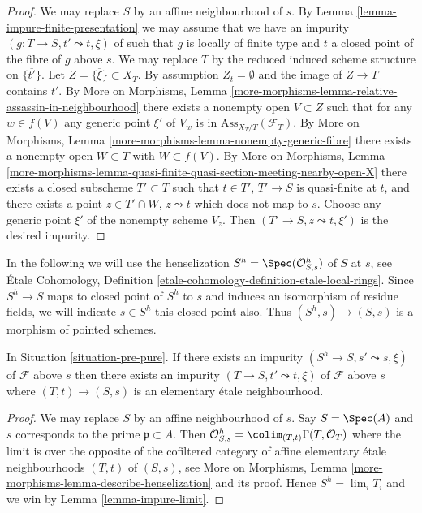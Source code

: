 \begin{proof}
We may replace $S$ by an affine neighbourhood of $s$. By
Lemma \ref{lemma-impure-finite-presentation}
we may assume that we have an impurity $(g : T \to S, t' \leadsto t, \xi)$
of such that $g$ is locally of finite type and $t$ a closed point of the
fibre of $g$ above $s$. We may replace $T$ by the reduced induced
scheme structure on $\overline{\{t'\}}$. Let
$Z = \overline{\{\xi\}} \subset X_T$. By assumption $Z_t = \emptyset$
and the image of $Z \to T$ contains $t'$. By
More on Morphisms,
Lemma \ref{more-morphisms-lemma-relative-assassin-in-neighbourhood}
there exists a nonempty open $V \subset Z$ such that for any
$w \in f(V)$ any generic point $\xi'$ of $V_w$ is in
$\text{Ass}_{X_T/T}(\mathcal{F}_T)$. By
More on Morphisms, Lemma \ref{more-morphisms-lemma-nonempty-generic-fibre}
there exists a nonempty open $W \subset T$ with $W \subset f(V)$. By
More on Morphisms, Lemma
\ref{more-morphisms-lemma-quasi-finite-quasi-section-meeting-nearby-open-X}
there exists a closed subscheme $T' \subset T$ such that
$t \in T'$, $T' \to S$ is quasi-finite at $t$, and there exists a point
$z \in T' \cap W$, $z \leadsto t$ which does not map to $s$.
Choose any generic point $\xi'$ of the nonempty scheme $V_z$.
Then $(T' \to S, z \leadsto t, \xi')$ is the desired impurity.
\end{proof}

\noindent
In the following we will use the henselization
$S^h = \Spec(\mathcal{O}_{S, s}^h)$
of $S$ at $s$, see
\'Etale Cohomology,
Definition \ref{etale-cohomology-definition-etale-local-rings}.
Since $S^h \to S$ maps to closed point of $S^h$ to $s$ and
induces an isomorphism of residue fields, we will indicate
$s \in S^h$ this closed point also. Thus $(S^h, s) \to (S, s)$ is
a morphism of pointed schemes.

\begin{lemma}
\label{lemma-impurity-on-henselization}
In Situation \ref{situation-pre-pure}.
If there exists an impurity $(S^h \to S, s' \leadsto s, \xi)$
of $\mathcal{F}$ above $s$ then there exists an impurity
$(T \to S, t' \leadsto t, \xi)$ of $\mathcal{F}$ above $s$
where $(T, t) \to (S, s)$ is an elementary \'etale neighbourhood.
\end{lemma}

\begin{proof}
We may replace $S$ by an affine neighbourhood of $s$.
Say $S = \Spec(A)$ and $s$ corresponds to the prime
$\mathfrak p \subset A$. Then
$\mathcal{O}_{S, s}^h = \colim_{(T, t)} \Gamma(T, \mathcal{O}_T)$
where the limit is over the opposite of the
cofiltered category of affine elementary \'etale neighbourhoods
$(T, t)$ of $(S, s)$, see
More on Morphisms,
Lemma \ref{more-morphisms-lemma-describe-henselization}
and its proof. Hence $S^h = \lim_i T_i$ and we win by
Lemma \ref{lemma-impure-limit}.
\end{proof}

